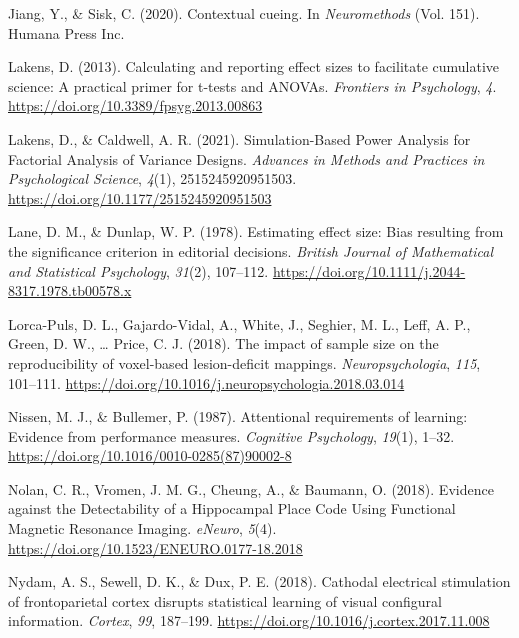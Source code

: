 \documentclass[
  man]{apa6}
\newlength{\cslhangindent}
\newlength{\cslentryspacingunit} %
\newenvironment{CSLReferences}[2] %
 {%
  \setlength{\parindent}{0pt}
  \ifodd #1
  \let\oldpar\par
  \def\par{\hangindent=\cslhangindent\oldpar}
  \fi
  \setlength{\parskip}{#2\cslentryspacingunit}
 }%
 {}
\begin{document}
\begin{CSLReferences}{1}{0}
\leavevmode{}%
Jiang, Y., \& Sisk, C. (2020). Contextual cueing. In \emph{Neuromethods} (Vol. 151). {Humana Press Inc}.

\leavevmode{}%
Lakens, D. (2013). Calculating and reporting effect sizes to facilitate cumulative science: A practical primer for t-tests and {ANOVAs}. \emph{Frontiers in Psychology}, \emph{4}. \url{https://doi.org/10.3389/fpsyg.2013.00863}

\leavevmode{}%
Lakens, D., \& Caldwell, A. R. (2021). Simulation-{Based Power Analysis} for {Factorial Analysis} of {Variance Designs}. \emph{Advances in Methods and Practices in Psychological Science}, \emph{4}(1), 2515245920951503. \url{https://doi.org/10.1177/2515245920951503}

\leavevmode{}%
Lane, D. M., \& Dunlap, W. P. (1978). Estimating effect size: {Bias} resulting from the significance criterion in editorial decisions. \emph{British Journal of Mathematical and Statistical Psychology}, \emph{31}(2), 107--112. \url{https://doi.org/10.1111/j.2044-8317.1978.tb00578.x}

\leavevmode{}%
Lorca-Puls, D. L., Gajardo-Vidal, A., White, J., Seghier, M. L., Leff, A. P., Green, D. W., \ldots{} Price, C. J. (2018). The impact of sample size on the reproducibility of voxel-based lesion-deficit mappings. \emph{Neuropsychologia}, \emph{115}, 101--111. \url{https://doi.org/10.1016/j.neuropsychologia.2018.03.014}

\leavevmode{}%
Nissen, M. J., \& Bullemer, P. (1987). Attentional requirements of learning: {Evidence} from performance measures. \emph{Cognitive Psychology}, \emph{19}(1), 1--32. \url{https://doi.org/10.1016/0010-0285(87)90002-8}

\leavevmode{}%
Nolan, C. R., Vromen, J. M. G., Cheung, A., \& Baumann, O. (2018). Evidence against the {Detectability} of a {Hippocampal Place Code Using Functional Magnetic Resonance Imaging}. \emph{eNeuro}, \emph{5}(4). \url{https://doi.org/10.1523/ENEURO.0177-18.2018}

\leavevmode{}%
Nydam, A. S., Sewell, D. K., \& Dux, P. E. (2018). Cathodal electrical stimulation of frontoparietal cortex disrupts statistical learning of visual configural information. \emph{Cortex}, \emph{99}, 187--199. \url{https://doi.org/10.1016/j.cortex.2017.11.008}


\end{CSLReferences}
\end{document}
